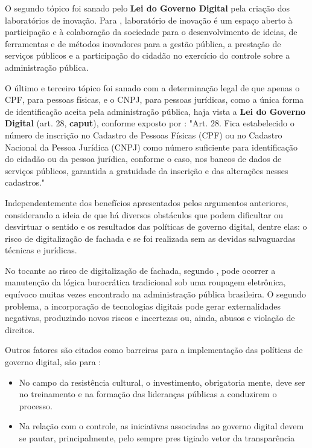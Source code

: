 O segundo tópico foi sanado pelo \textbf{Lei do Governo Digital} pela criação dos laboratórios de inovação. Para \cite{l14129}, laboratório de inovação é um espaço aberto à participação e à colaboração da sociedade para o desenvolvimento de ideias, de ferramentas e de métodos inovadores para a gestão pública, a prestação de serviços públicos e a participação do cidadão no exercício do controle sobre a administração pública.

O último e terceiro tópico foi sanado com a determinação legal de que apenas o CPF, para pessoas físicas, e o CNPJ, para pessoas jurídicas, como a única forma de identificação aceita pela administração pública, haja vista a \textbf{Lei do Governo Digital} (art. 28, \textbf{caput}), conforme exposto por \cite{l14129}: "Art. 28.  Fica estabelecido o número de inscrição no Cadastro de Pessoas Físicas (CPF) ou no Cadastro Nacional da Pessoa Jurídica (CNPJ) como número suficiente para identificação do cidadão ou da pessoa jurídica, conforme o caso, nos bancos de dados de serviços públicos, garantida a gratuidade da inscrição e das alterações nesses cadastros."

Independentemente dos benefícios apresentados pelos argumentos anteriores, considerando \cite{de2020governo} a ideia de que há diversos obstáculos que podem dificultar ou desvirtuar o sentido e os resultados das políticas de governo digital, dentre elas: o risco de digitalização de fachada e se foi realizada sem as devidas salvaguardas técnicas e jurídicas.

No tocante ao risco de digitalização de fachada, segundo \cite{de2020governo}, pode ocorrer a manutenção da lógica burocrática tradicional sob uma roupagem eletrônica, equívoco muitas vezes encontrado na administração pública brasileira. O segundo problema, a incorporação de tecnologias digitais pode gerar externalidades negativas, produzindo novos riscos e incertezas ou, ainda, abusos e violação de direitos.

Outros fatores são citados como barreiras para a implementação das políticas de governo digital, são para \cite{do2022governo}: 

\begin{itemize}
    \item No campo da resistência cultural, o investimento, obrigatoria
    mente, deve ser no treinamento e na formação das lideranças públicas 
    a conduzirem o processo.
    \item Na relação com o controle, as iniciativas associadas 
    ao governo digital devem se pautar, principalmente, pelo sempre pres
    tigiado vetor da transparência
\end{itemize}

